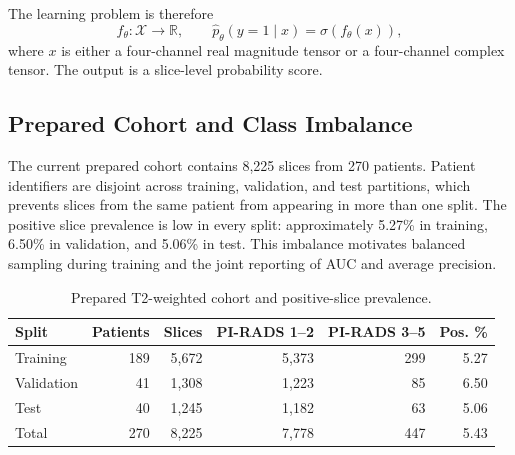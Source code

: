 The learning problem is therefore
\begin{equation}
f_\theta:\mathcal{X}\rightarrow\mathbb{R},\qquad
\hat p_\theta(y=1\mid x)=\sigma(f_\theta(x)),
\label{eq:classification-map}
\end{equation}
where $x$ is either a four-channel real magnitude tensor or a four-channel complex tensor. The output is a slice-level probability score.

\subsection{Prepared Cohort and Class Imbalance}
The current prepared cohort contains 8,225 slices from 270 patients. Patient identifiers are disjoint across training, validation, and test partitions, which prevents slices from the same patient from appearing in more than one split. The positive slice prevalence is low in every split: approximately 5.27\% in training, 6.50\% in validation, and 5.06\% in test. This imbalance motivates balanced sampling during training and the joint reporting of AUC and average precision.

\begin{table}[t]
\centering
\caption{Prepared T2-weighted cohort and positive-slice prevalence.}
\label{tab:cohort}
\scriptsize
\begin{tabular}{lrrrrr}
\toprule
Split & Patients & Slices & PI-RADS 1--2 & PI-RADS 3--5 & Pos. \% \\
\midrule
Training   & 189 & 5,672 & 5,373 & 299 & 5.27 \\
Validation & 41  & 1,308 & 1,223 & 85  & 6.50 \\
Test       & 40  & 1,245 & 1,182 & 63  & 5.06 \\
\midrule
Total      & 270 & 8,225 & 7,778 & 447 & 5.43 \\
\bottomrule
\end{tabular}
\end{table}

